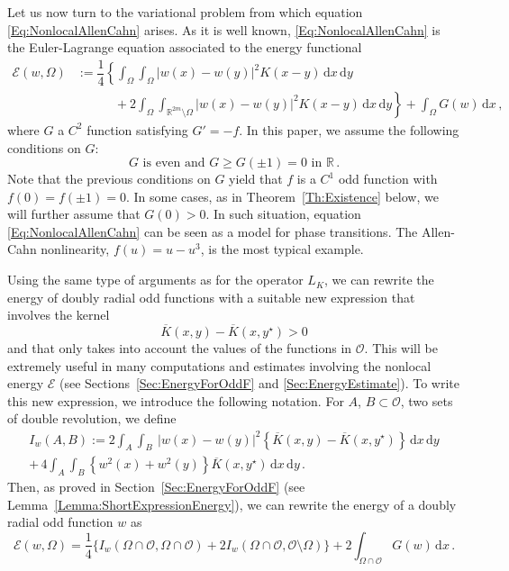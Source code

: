 \documentclass[12pt,reqno]{amsart}
\theoremstyle{definition}
\theoremstyle{remark}
\newcommand{\con}[1]{\mathbb{#1}}
\newcommand{\R}{\con{R}} %
\newcommand{\ecal}{\mathcal{E}}
\newcommand{\ocal}{\mathcal{O}}
\renewcommand{\d}{\,\mathrm{d}} %
\numberwithin{equation}{section}
\begin{document}
Let us now turn to the variational problem from which equation \eqref{Eq:NonlocalAllenCahn} arises. As it is well known, \eqref{Eq:NonlocalAllenCahn} is the Euler-Lagrange equation associated to the energy functional
\begin{equation}
\label{Eq:Energy}
\begin{split}
\ecal(w, \Omega) &:= 
\dfrac{1}{4} \left \{ \int_\Omega \int_\Omega |w(x) - w(y)|^2 K(x-y) \d x \d y \right. \qquad \qquad \\
& \quad \quad \quad +\left. 2 \int_\Omega \int_{\R^{2m} \setminus \Omega} |w(x) - w(y)|^2 K(x-y) \d x \d y \right \} + \int_{\Omega} G(w) \d x \,,
\end{split}
\end{equation}
where $G$ a $C^2$ function satisfying $G' = -f$. In this paper, we assume the following conditions on $G$:
\begin{equation}
\label{Eq:HipothesesG}
G \textrm{ is even and } G\geq G(\pm 1 )=0 \textrm{ in } \R\,.
\end{equation}
Note that the previous conditions on $G$ yield that $f$ is a $C^1$ odd function with $f(0)=f(\pm 1)=0$. In some cases, as in Theorem~\ref{Th:Existence} below, we will further assume that $G(0)>0$. In such situation, equation \eqref{Eq:NonlocalAllenCahn} can be seen as a model for phase transitions. The Allen-Cahn nonlinearity, $f(u) = u-u^3$, is the most typical example.


Using the same type of arguments as for the operator $L_K$, we can rewrite the energy of doubly radial odd functions with a suitable new expression that involves the kernel 
$$\overline{K}(x,y)-\overline{K}(x,y^\star)>0$$
and that only takes into account the values of the functions in $\ocal$. This will be extremely useful in many computations and estimates involving the nonlocal energy $\ecal$ (see Sections~\ref{Sec:EnergyForOddF} and \ref{Sec:EnergyEstimate}). To write this new expression, we introduce the following notation.  For $A$, $B\subset \ocal$, two sets of double revolution, we define
\begin{equation*}
\begin{split}
I_w(A,B) := 2\int_A  \int_B  \ |w(x)-w(y)|^2 \left\{ \overline{K}(x,y) - \overline{K}(x,y^\star) \right\} \d x \d y  \\
+\, 4 \int_A  \int_B  \left\{w^2(x)+w^2(y)\right\} \overline{K}(x,y^\star) \d x \d y\,.
\end{split}
\end{equation*}
Then, as proved in Section~\ref{Sec:EnergyForOddF} (see Lemma~\ref{Lemma:ShortExpressionEnergy}), we can rewrite the energy of a doubly radial odd function $w$ as
\begin{equation}
\label{Eq:ShortExpressionEnergyIntro}
\ecal(w, \Omega) = \frac{1}{4} \big \{I_w(\Omega\cap\ocal,\Omega\cap\ocal) +  2I_w(\Omega\cap\ocal,\ocal\setminus\Omega) \big \} + 2\int_{\Omega\cap \ocal} G(w) \d x \,.
\end{equation}
\end{document}
